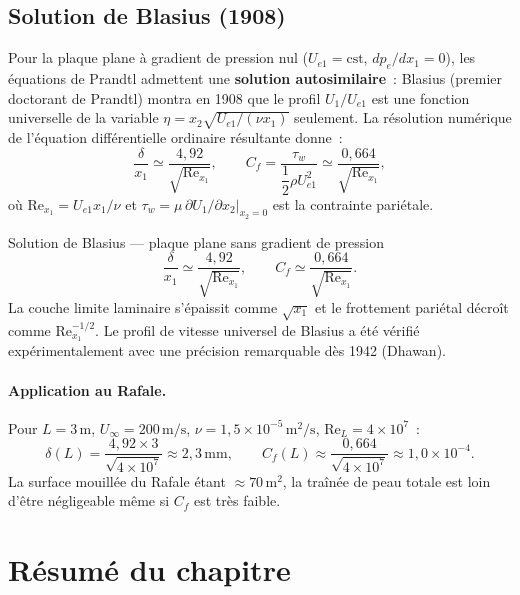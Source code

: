 \documentclass[11pt,a4paper]{report}
\begin{document}
\subsection{Solution de Blasius (1908)}

Pour la plaque plane \`a gradient de pression nul ($U_{e1} = \text{cst}$,
$dp_e/dx_1=0$), les \'equations de Prandtl admettent une \textbf{solution autosimilaire}~:
Blasius (premier doctorant de Prandtl) montra en 1908 que le profil $U_1/U_{e1}$ est une
fonction universelle de la variable $\eta = x_2\sqrt{U_{e1}/(\nu x_1)}$ seulement. La
r\'esolution num\'erique de l'\'equation diff\'erentielle ordinaire r\'esultante donne~:
\[
  \frac{\delta}{x_1} \simeq \frac{4{,}92}{\sqrt{\mathrm{Re}_{x_1}}},
  \qquad
  C_f = \frac{\tau_w}{\dfrac{1}{2}\rho U_{e1}^2}
  \simeq \frac{0{,}664}{\sqrt{\mathrm{Re}_{x_1}}},
\]
o\`u $\mathrm{Re}_{x_1} = U_{e1}x_1/\nu$ et $\tau_w = \mu\,\partial U_1/\partial
x_2\big|_{x_2=0}$ est la contrainte pari\'etale.

\begin{defbox}{Solution de Blasius --- plaque plane sans gradient de pression}
\[
  \dfrac{\delta}{x_1} \simeq \dfrac{4{,}92}{\sqrt{\mathrm{Re}_{x_1}}},
  \qquad
  C_f \simeq \dfrac{0{,}664}{\sqrt{\mathrm{Re}_{x_1}}}.
\]
La couche limite laminaire s'\'epaissit comme $\sqrt{x_1}$ et le frottement pari\'etal
d\'ecro\^it comme $\mathrm{Re}_{x_1}^{-1/2}$. Le profil de vitesse universel de Blasius
a \'et\'e v\'erifi\'e exp\'erimentalement avec une pr\'ecision remarquable d\`es 1942
(Dhawan).
\end{defbox}

\paragraph{Application au Rafale.}
Pour $L = 3\,\text{m}$, $U_\infty = 200\,\text{m/s}$, $\nu = 1{,}5\times10^{-5}\,
\text{m}^2/\text{s}$, $\mathrm{Re}_L = 4\times10^7$~:
\[
  \delta(L) = \frac{4{,}92 \times 3}{\sqrt{4\times10^7}} \approx 2{,}3\,\text{mm},
  \qquad
  C_f(L) \approx \frac{0{,}664}{\sqrt{4\times10^7}} \approx 1{,}0\times10^{-4}.
\]
La surface mouill\'ee du Rafale \'etant $\approx 70\,\text{m}^2$, la tra\^in\'ee de
peau totale est loin d'\^etre n\'egligeable m\^eme si $C_f$ est tr\`es faible.

\section*{Résumé du chapitre}
\end{document}
